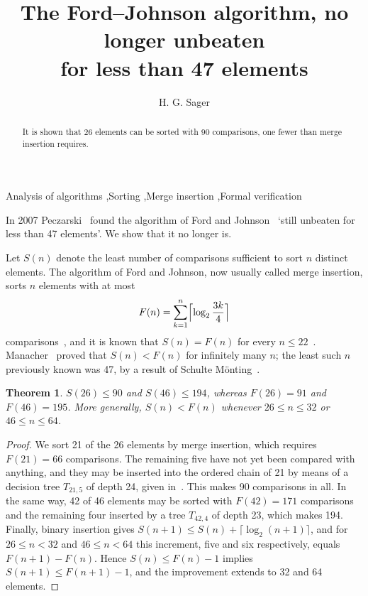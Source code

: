 \documentclass[final,3p,times]{elsarticle}
\newtheorem*{theorem}{Theorem}
\begin{document}
\begin{frontmatter}

\title{The Ford--Johnson algorithm, no longer unbeaten\\ for less than 47 elements}

\author{H. G. Sager}
\address{Independent researcher}

\begin{abstract}
It is shown that 26 elements can be sorted with 90 comparisons, one fewer than merge
insertion requires.
\end{abstract}

\begin{keyword}
Analysis of algorithms \sep Sorting \sep Merge insertion \sep Formal verification
\end{keyword}

\end{frontmatter}

In 2007 Peczarski~\cite{Pec07} found the algorithm of Ford and Johnson~\cite{FJ59}
`still unbeaten for less than 47 elements'. We show that it no longer is.

Let $S(n)$ denote the least number of comparisons sufficient to sort $n$ distinct
elements. The algorithm of Ford and Johnson, now usually called merge insertion, sorts $n$
elements with at most
\[
  F(n) = \sum_{k=1}^{n} \Bigl\lceil \log_2 \frac{3k}{4} \Bigr\rceil
\]
comparisons~\cite{Knuth98}, and it is known that $S(n) = F(n)$ for every $n \le
22$~\cite{Knuth98,Pec04,Pec07,SW23}. Manacher~\cite{Man79} proved that $S(n) < F(n)$ for
infinitely many $n$; the least such $n$ previously known was 47, by a result of Schulte
M\"onting~\cite{SM81}.

\begin{theorem}
$S(26) \le 90$ and $S(46) \le 194$, whereas $F(26) = 91$ and $F(46) = 195$. More
generally, $S(n) < F(n)$ whenever $26 \le n \le 32$ or $46 \le n \le 64$.
\end{theorem}

\begin{proof}
We sort 21 of the 26 elements by merge insertion, which requires $F(21) = 66$
comparisons. The remaining five have not yet been compared with anything, and they may be
inserted into the ordered chain of 21 by means of a decision tree $T_{21,5}$ of depth 24,
given in~\cite{data}. This makes 90 comparisons in all. In the same way, 42 of 46 elements
may be sorted with $F(42) = 171$ comparisons and the remaining four inserted by a tree
$T_{42,4}$ of depth 23, which makes 194. Finally, binary insertion gives $S(n+1) \le S(n) + \lceil \log_2 (n+1) \rceil$, and for
$26 \le n < 32$ and $46 \le n < 64$ this increment, five and six respectively, equals
$F(n+1) - F(n)$. Hence $S(n) \le F(n) - 1$ implies $S(n+1) \le F(n+1) - 1$, and the
improvement extends to 32 and 64 elements.
\end{proof}
\end{document}
